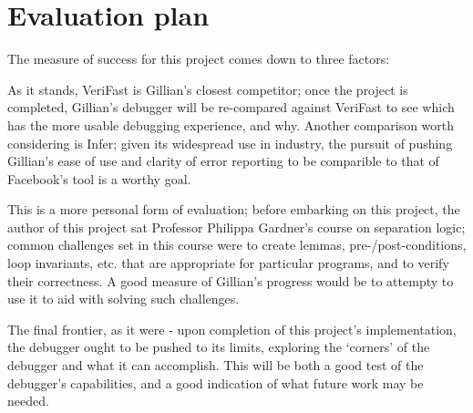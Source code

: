 \chapter{Evaluation plan}
\label{cha:eval}

The measure of success for this project comes down to three factors:

As it stands, VeriFast is Gillian's closest competitor; once the project is
completed, Gillian's debugger will be re-compared against VeriFast to see which
has the more usable debugging experience, and why. Another comparison worth
considering is Infer; given its widespread use in industry, the pursuit of
pushing Gillian's ease of use and clarity of error reporting to be comparible
to that of Facebook's tool is a worthy goal.

This is a more personal form of evaluation; before embarking on this project,
the author of this project sat Professor Philippa Gardner's course on
separation logic; common challenges set in this course were to create lemmas,
pre-/post-conditions, loop invariants, etc. that are appropriate for particular
programs, and to verify their correctness. A good measure of Gillian's progress
would be to attempty to use it to aid with solving such challenges.

The final frontier, as it were - upon completion of this project's
implementation, the debugger ought to be pushed to its limits, exploring the
`corners' of the debugger and what it can accomplish. This will be both a good
test of the debugger's capabilities, and a good indication of what future work
may be needed.
